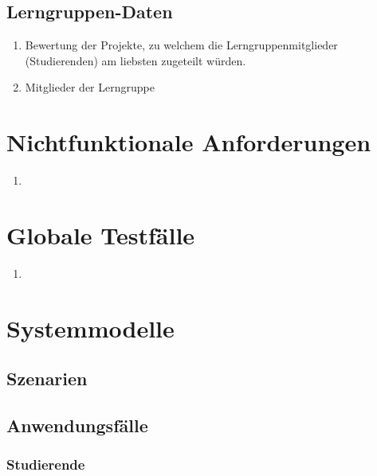 \documentclass[parskip=full]{scrartcl}
\newcommand{\swtLabel}[1]{\textbf{\textbackslash #1\arabic*0\textbackslash}}
\begin{document}
\subsection{Lerngruppen-Daten} 
\begin{enumerate}[label=\swtLabel{D}, resume] 
  \item Bewertung der Projekte, zu welchem die Lerngruppenmitglieder
  (Studierenden) am liebsten zugeteilt würden.
  \item Mitglieder der Lerngruppe
\end{enumerate}

\section{Nichtfunktionale Anforderungen}
\begin{enumerate}
  \item 
\end{enumerate}
\section{Globale Testfälle}
\begin{enumerate}
  \item 
\end{enumerate}
\section{Systemmodelle}

\subsection{Szenarien}

\subsection{Anwendungsfälle}

\subsubsection{Studierende}
\end{document}
